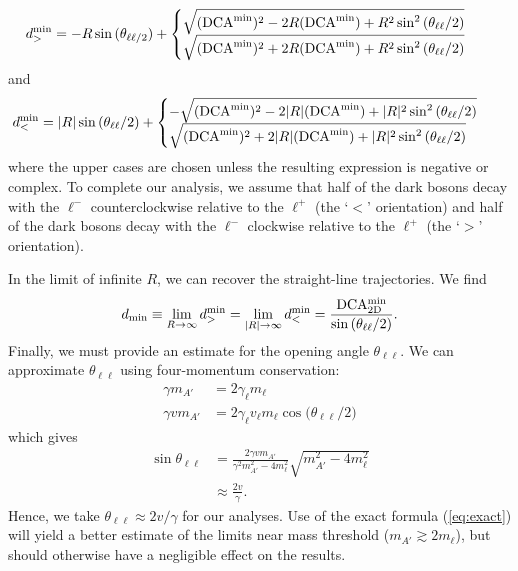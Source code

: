 \begin{align}
    d_{>}^{\rm min} &= -R\sin{(\theta_{\ell\ell/2})} + \begin{cases}
    \sqrt{({\rm DCA}^{\rm min})^2 - 2R({\rm DCA}^{\rm min})+R^2\sin^2{(\theta_{\ell\ell}/2)}}\\
    \sqrt{({\rm DCA}^{\rm min})^2 + 2R({\rm DCA}^{\rm min})+R^2\sin^2{(\theta_{\ell\ell}/2)}}
    \end{cases}
\end{align}
and
\begin{align}
    d_{<}^{\rm min} &= |R|\sin{(\theta_{\ell\ell}/2)} + \begin{cases}
    -\sqrt{({\rm DCA}^{\rm min})^2 - 2|R|({\rm DCA}^{\rm min})+|R|^2\sin^2{(\theta_{\ell\ell}/2)}}\\
    \sqrt{({\rm DCA}^{\rm min})^2 + 2|R|({\rm DCA}^{\rm min})+|R|^2\sin^2{(\theta_{\ell\ell}/2)}}
    \end{cases}
\end{align}
where the upper cases are chosen unless the resulting expression is negative or complex. To complete our analysis, we assume that half of the dark bosons decay with the $\ell^-$ counterclockwise relative to the $\ell^+$ (the `$<$' orientation) and half of the dark bosons decay with the $\ell^-$ clockwise relative to the $\ell^+$ (the `$>$' orientation).

In the limit of infinite $R$, we can recover the straight-line trajectories. We find 
\begin{align}
    d_{\rm min} \equiv \lim_{R \rightarrow \infty}{ d}^{\rm min}_> = \lim_{|R| \rightarrow \infty}{d}^{\rm min}_< = \frac{\rm DCA^{\rm min}_{\rm 2D}}{\sin{(\theta_{\ell\ell}/2)}}.
\end{align}
Finally, we must provide an estimate for the opening angle $\theta_{\ell\ell}$. We can approximate $\theta_{\ell\ell}$ using four-momentum conservation:
\begin{align}
    \gamma m_{A'} &= 2\gamma_\ell m_\ell\\
    \gamma v m_{A'} &= 2\gamma_\ell v_\ell m_\ell \cos{(\theta_{\ell\ell}/2})
\end{align}
which gives
\begin{align}
    \sin{\theta_{\ell\ell}} &= \frac{2\gamma v m_{A'}}{\gamma^2 m_{A'}^2 - 4m_\ell^2 }\sqrt{m_{A'}^2 - 4m_{\ell}^2} \label{eq:exact}\\
    &\approx \frac{2v}{\gamma}.
\end{align}
Hence, we take $\theta_{\ell\ell}\approx 2v/\gamma$ for our analyses. Use of the exact formula (\ref{eq:exact}) will yield a better estimate of the limits near mass threshold ($m_{A'} \gtrsim 2m_\ell$), but should otherwise have a negligible effect on the results.